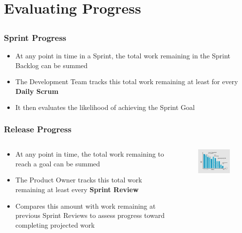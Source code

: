 \section{Evaluating Progress}
\subsection{}

\begin{frame}
    \frametitle{Sprint Progress}
    \begin{itemize}
        \setlength\itemsep{0.7em}
        \item At any point in time in a Sprint, the total work remaining in the Sprint Backlog can be summed
        \item The Development Team tracks this total work remaining at least for every \textbf{Daily Scrum}
        \item It then evaluates the likelihood of achieving the Sprint Goal
    \end{itemize}
\end{frame}

\begin{frame}
    \frametitle{Release Progress}
    \begin{columns}
        \begin{column}{0.5\textwidth}
            \begin{itemize}
                \setlength\itemsep{0.7em}
                \item At any point in time, the total work remaining to reach a goal can be summed
                \item The Product Owner tracks this total work remaining at least every \textbf{Sprint Review}
                \item Compares this amount with work remaining at previous Sprint Reviews to assess progress toward completing projected work
            \end{itemize}
        \end{column}
        \begin{column}{0.5\textwidth}
            \vspace{-1em}
            \begin{figure}
                \includegraphics[width=2.7in]{images/burndown.png}
            \end{figure}
        \end{column}
    \end{columns}
\end{frame}